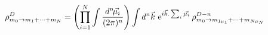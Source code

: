 \begin{equation}
 \rho^{D}_{m_0\rightarrow m_{1}+\cdots +m_{N}}=
 \left(\prod_{i=1}^N\int\frac{d^n\!\vec{\mu_i}}{(2\pi)^n}\right)
 \int d^n\vec{k}\,\,{\rm e}^{i\vec{k}.\sum_i\vec{\mu_i}} 
 \, \rho^{D-n}_{m_0\rightarrow m_{1\mu_1}+\cdots +m_{N\mu_N}}
\end{equation}

